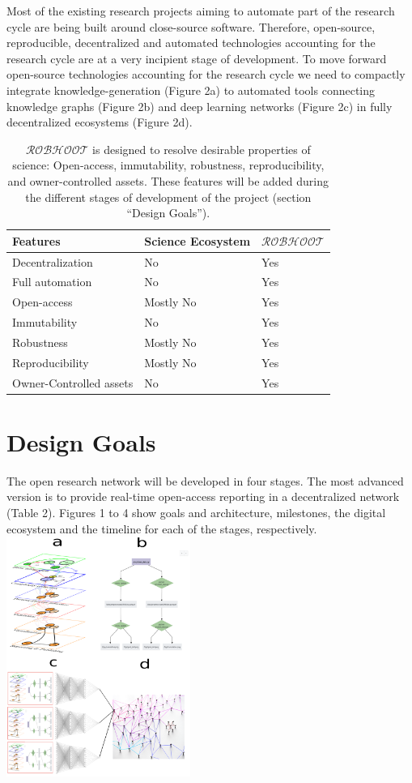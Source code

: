 \documentclass[10pt, a4paper, twocolumn]{article} %
\begin{document}
{Most of the existing research projects aiming to automate part of the
research cycle are being built around close-source
software. Therefore, open-source, reproducible, decentralized and
automated technologies accounting for the research cycle are at a very
incipient stage of development. To move forward open-source
technologies accounting for the research cycle we need to compactly
integrate knowledge-generation (Figure 2a) to automated tools
connecting knowledge graphs (Figure 2b) and deep learning networks
(Figure 2c) in fully decentralized ecosystems (Figure 2d).
\begin{table}
\begin{tabular}{ p{3cm} | p{2cm} | p{2cm}}
  \hline \hline
  \textbf{Features} & \textbf{Science Ecosystem} &\textbf{{\bf $\mathcal{ROBHOOT}$}}\\  \hline
  Decentralization & No & Yes \\ \hline
  Full automation & No & Yes \\ \hline
  Open-access & Mostly No & Yes \\ \hline
  Immutability & No & Yes \\ \hline
  Robustness & Mostly No & Yes \\ \hline
  Reproducibility & Mostly No & Yes \\ \hline        
  Owner-Controlled assets & No & Yes \\ \hline       
  \bottomrule
\end{tabular}
\caption{{\bf $\mathcal{ROBHOOT}$} is designed to resolve desirable
  properties of science: Open-access, immutability, robustness,
  reproducibility, and owner-controlled assets. These features will be
  added during the different stages of development of the project
  (section ``Design Goals'').}
\end{table}
  \section{Design Goals}
  The open research network will be developed in four stages. The most
  advanced version is to provide real-time open-access reporting in a
  decentralized network (Table 2). Figures 1 to 4 show goals and
  architecture, milestones, the digital ecosystem and the timeline for
  each of the stages, respectively.
  \includegraphics[width=0.45\textwidth]{Figure1.pdf}
  
}
\end{document}
